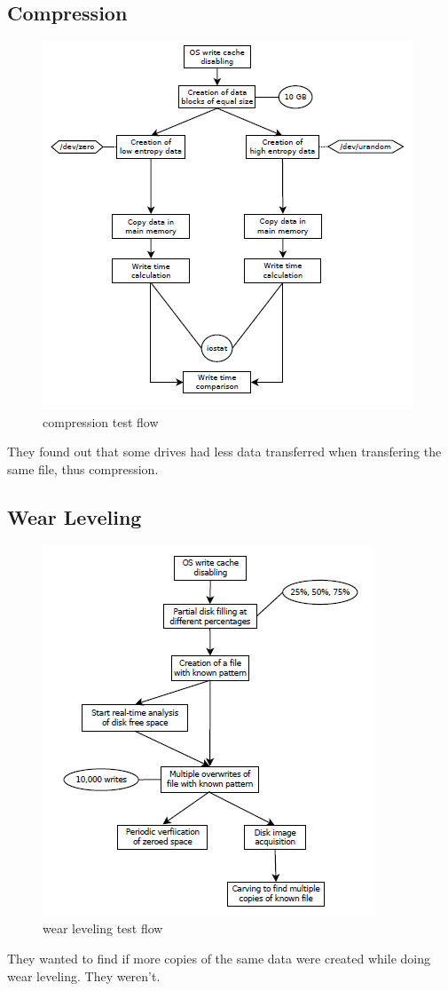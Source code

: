    \subsection{Compression}
        \begin{figure}[ht!]
            \centering
            \includegraphics[width=0.8\linewidth]{compression.png}
            \caption{compression test flow}
        \end{figure}
        They found out that some drives had less data transferred when transfering the same file, thus compression.
    \subsection{Wear Leveling}
        \begin{figure}[ht!]
            \centering
            \includegraphics[width=0.8\linewidth]{wearleveling.png}
            \caption{wear leveling test flow}
        \end{figure}
        They wanted to find if more copies of the same data were created while doing wear leveling. They weren't.

